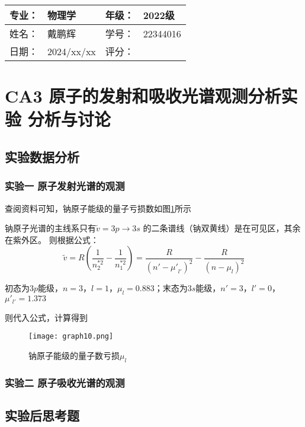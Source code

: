 \documentclass[dvipsnames, svgnames,a4paper,11pt]{article}
\begin{document}
\clearpage
\begin{table}
	\renewcommand\arraystretch{1.7}
	\begin{tabularx}{\textwidth}{|X|X|X|X|}
	\hline
	专业：& 物理学 &年级：& 2022级\\
	\hline
	姓名： & 戴鹏辉 & 学号：& 22344016\\
	\hline
    日期：& 2024/xx/xx & 评分： &\\
	\hline
	\end{tabularx}
\end{table}

\section{CA3 \quad 原子的发射和吸收光谱观测分析实验 \quad\heiti 分析与讨论}

\subsection{实验数据分析}

	\subsubsection{实验一 \quad 原子发射光谱的观测}
		
		查阅资料可知，钠原子能级的量子亏损数如图\ref{fig:graph10}所示
		
		钠原子光谱的主线系只有$\widetilde{v}=3p \rightarrow 3s$ 的二条谱线（钠双黄线）是在可见区，其余在紫外区。
		则根据公式：
		\[
		\widetilde{v}=R(\frac{1}{n_2^{*2}}-\frac{1}{n_1^{*2}})=\frac{R}{{(n'-{\mu'}_{l'})}^2}-\frac{R}{{(n-\mu_l)}^2}
		\]
		
		初态为$3p$能级，$n=3$，$l=1$，$\mu_l=0.883$；末态为$3s$能级，$n'=3$，$l'=0$，$\mu'_{l'}=1.373$
		
		则代入公式，计算得到
		
		\begin{figure}[htbp]
			\centering
			\texttt{[image: graph10.png]}
			\caption{钠原子能级的量子数亏损$\mu_l$}
			\label{fig:graph10}
		\end{figure}
		
	\subsubsection{实验二 原子吸收光谱的观测}
			
			
			
			
\subsection{实验后思考题}
\end{document}

